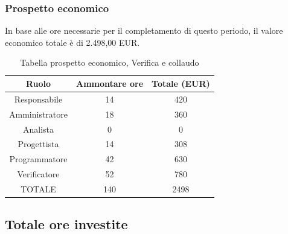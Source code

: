 \subsubsection{Prospetto economico}
In base alle ore necessarie per il completamento di questo periodo, il valore economico totale è di 2.498,00 EUR.
\begin{table}[h]
\caption{Tabella prospetto economico, Verifica e collaudo}
\begin{center}
\begin{tabular}{ |c|c|c|  }
 \hline
 Ruolo 		& Ammontare ore 	& Totale (EUR)\\
 \hline
 \hline
 	Responsabile	& 14 	& 420\\
	Amministratore	& 18		& 360\\
	Analista		& 0 		& 0\\
	Progettista		& 14		& 308\\
	Programmatore	& 42		& 630\\
	Verificatore	& 52 	& 780\\
 \hline\hline
 TOTALE		& 140		& 2498\\
  \hline
\end{tabular}
\end{center}
\end{table}
\newpage
\subsection{Totale ore investite}
